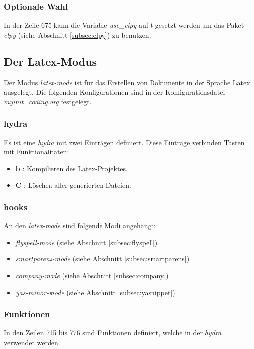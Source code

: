 \subsubsection{Optionale Wahl}
In der Zeile 675 kann die Variable \textit{use\_elpy} auf
{\glqq}t{\grqq} gesetzt werden um das Paket \textit{elpy} (siehe
Abschnitt \ref{subsec:elpy}) zu benutzen.

\subsection{Der Latex-Modus}
\label{subsec:latexmoduskonf}
Der Modus \textit{latex-mode} ist für das Erstellen von Dokumente in
der Sprache Latex ausgelegt. Die folgenden Konfigurationen sind in der
Konfigurationsdatei \textit{myinit\_coding.org} festgelegt.\\

\subsubsection{hydra}
Es ist eine \textit{hydra} mit zwei Einträgen definiert. Diese
Einträge verbinden Tasten mit Funktionalitäten:
\begin{itemize}
\item \textbf{b} : Kompilieren des Latex-Projektes.
\item \textbf{C} : Löschen aller generierten Dateien.
\end{itemize}

\subsubsection{hooks}
An den \textit{latex-mode} sind folgende Modi angehängt:
\begin{itemize}
\item \textit{flyspell-mode} (siehe Abschnitt \ref{subsec:flyspell})
\item \textit{smartparens-mode} (siehe Abschnitt
  \ref{subsec:smartparens})
\item \textit{company-mode} (siehe Abschnitt \ref{subsec:company})
\item \textit{yas-minor-mode} (siehe Abschnitt
  \ref{subsec:yasnippet})\\
\end{itemize}

\subsubsection{Funktionen}
In den Zeilen 715 bis 776 sind Funktionen definiert, welche in der
\textit{hydra} verwendet werden.\\

